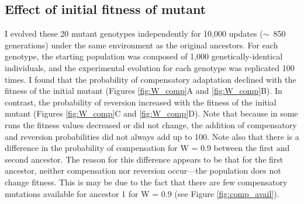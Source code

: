 \begin{doublespace}
\subsection{Effect of initial fitness of mutant}

I evolved these 20 mutant genotypes independently
for 10,000 updates ($\sim$~850 generations)
under the same environment as the original ancestors.
%
For each genotype, the starting population
was composed of 1,000 genetically-identical individuals,
and the experimental evolution for each genotype was replicated 100 times.
%
I found that the probability of compensatory adaptation
declined with the fitness of the initial mutant
(Figures \ref{fig:W_comp}A and \ref{fig:W_comp}B).
%
In contrast, the probability of reversion
increased with the fitness of the initial mutant
(Figures \ref{fig:W_comp}C and \ref{fig:W_comp}D).
%
Note that because in some runs the fitness values decreased or did not change,
the addition of compensatory and reversion probabilities
did not always add up to 100.
%
Note also that there is a difference in the probability of compensation
for W = 0.9 between the first and second ancestor.
%
The reason for this difference appears to be that
for the first ancestor, neither compensation nor reversion
occur---the population does not change fitness.
%
This is may be due to the fact that there are few compensatory mutations
available for ancestor 1 for W = 0.9 (see Figure \ref{fig:comp_avail}).




\end{doublespace}
